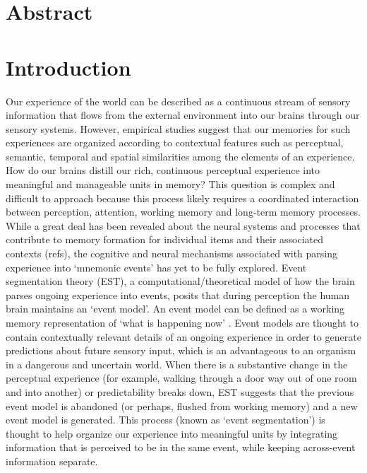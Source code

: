\section{Abstract}\label{abstract}

\section{Introduction}\label{introduction}

Our experience of the world can be described as a continuous stream of
sensory information that flows from the external environment into our
brains through our sensory systems. However, empirical studies suggest
that our memories for such experiences are organized according to
contextual features such as perceptual, semantic, temporal and spatial
similarities among the elements of an experience. How do our brains
distill our rich, continuous perceptual experience into meaningful and
manageable units in memory? This question is complex and difficult to
approach because this process likely requires a coordinated interaction
between perception, attention, working memory and long-term memory
processes. While a great deal has been revealed about the neural systems
and processes that contribute to memory formation for individual items
and their associated contexts (refs), the cognitive and neural
mechanisms associated with parsing experience into `mnemonic events' has
yet to be fully explored. Event segmentation theory (EST), a
computational/theoretical model of how the brain parses ongoing
experience into events, posits that during perception the human brain
maintains an `event model'. An event model can be defined as a working
memory representation of `what is happening now'
\autocite{kurby_segmentation_2008}. Event models are thought to contain
contextually relevant details of an ongoing experience in order to
generate predictions about future sensory input, which is an
advantageous to an organism in a dangerous and uncertain world. When
there is a substantive change in the perceptual experience (for example,
walking through a door way out of one room and into another) or
predictability breaks down, EST suggests that the previous event model
is abandoned (or perhaps, flushed from working memory) and a new event
model is generated. This process (known as `event segmentation') is
thought to help organize our experience into meaningful units by
integrating information that is perceived to be in the same event, while
keeping across-event information separate.

